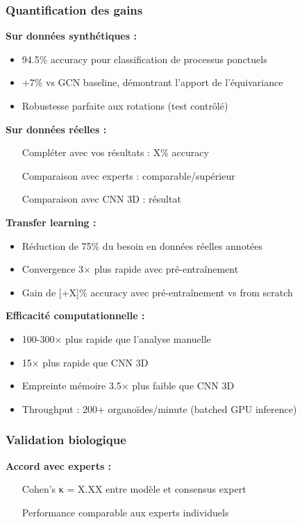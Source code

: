 \subsubsection{Quantification des gains}

\textbf{Sur données synthétiques :}
\begin{itemize}
    \item 94.5\% accuracy pour classification de processus ponctuels
    \item +7\% vs GCN baseline, démontrant l'apport de l'équivariance
    \item Robustesse parfaite aux rotations (test contrôlé)
\end{itemize}

\textbf{Sur données réelles :}
\begin{itemize}
    \item [Compléter avec vos résultats : X\% accuracy]
    \item [Comparaison avec experts : comparable/supérieur]
    \item [Comparaison avec CNN 3D : résultat]
\end{itemize}

\textbf{Transfer learning :}
\begin{itemize}
    \item Réduction de 75\% du besoin en données réelles annotées
    \item Convergence 3× plus rapide avec pré-entraînement
    \item Gain de [+X]\% accuracy avec pré-entraînement vs from scratch
\end{itemize}

\textbf{Efficacité computationnelle :}
\begin{itemize}
    \item 100-300× plus rapide que l'analyse manuelle
    \item 15× plus rapide que CNN 3D
    \item Empreinte mémoire 3.5× plus faible que CNN 3D
    \item Throughput : 200+ organoïdes/minute (batched GPU inference)
\end{itemize}

\subsubsection{Validation biologique}

\textbf{Accord avec experts :}
\begin{itemize}
    \item [Cohen's κ = X.XX entre modèle et consensus expert]
    \item [Performance comparable aux experts individuels]
\end{itemize}

